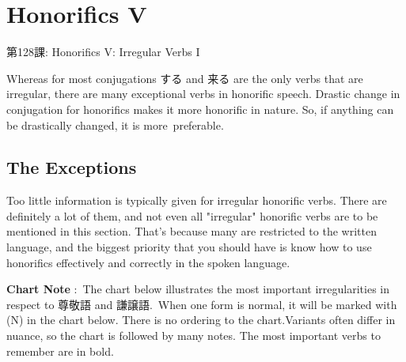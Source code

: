     
\chapter{Honorifics V}

\begin{center}
\begin{Large}
第128課: Honorifics V: Irregular Verbs I  
\end{Large}
\end{center}
 
\par{ Whereas for most conjugations する and 来る are the only verbs that are irregular, there are many exceptional verbs in honorific speech. Drastic change in conjugation for honorifics makes it more honorific in nature. So, if anything can be drastically changed, it is more preferable. }
      
\section{The Exceptions}
 
\par{ Too little information is typically given for irregular honorific verbs. There are definitely a lot of them, and not even all "irregular" honorific verbs are to be mentioned in this section. That's because many are restricted to the written language, and the biggest priority that you should have is know how to use honorifics effectively and correctly in the spoken language. }

\par{\textbf{Chart Note }: The chart below illustrates the most important irregularities in respect to 尊敬語 and 謙譲語. When one form is normal, it will be marked with (N) in the chart below. There is no ordering to the chart.Variants often differ in nuance, so the chart is followed by many notes. The most important verbs to remember are in bold. }
 
